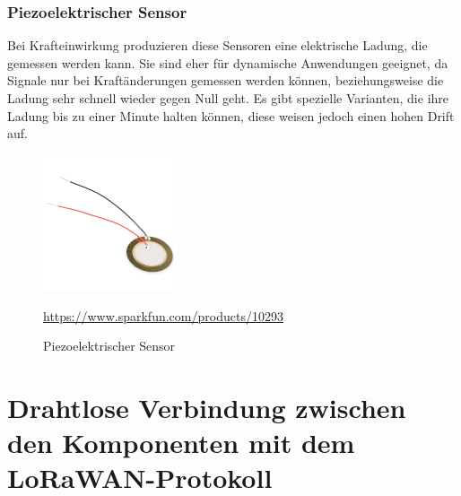 \subsection{Piezoelektrischer Sensor}
Bei Krafteinwirkung produzieren diese Sensoren eine elektrische Ladung, die gemessen werden kann. Sie sind eher für dynamische Anwendungen geeignet, da Signale nur bei Kraftänderungen gemessen werden können, beziehungsweise die Ladung sehr schnell wieder gegen Null geht. Es gibt spezielle Varianten, die ihre Ladung bis zu einer Minute halten können, diese weisen jedoch einen hohen Drift auf. 
\begin{figure}[ht]
    \center
    \includegraphics[width=4cm]{Bilder/waegezelle-ring.png}\\
    \caption{Piezoelektrischer Sensor}
    \begin{center} \quelle\url{https://www.sparkfun.com/products/10293} \end{center}
\end{figure}

\chapter{Drahtlose Verbindung zwischen den Komponenten mit dem LoRaWAN-Protokoll}
